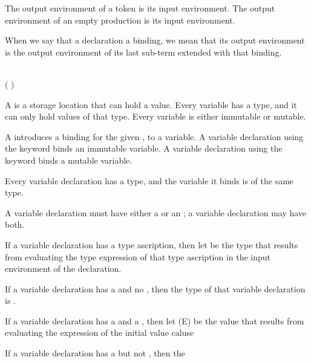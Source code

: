 The output environment of a token is its input environment.
The output environment of an empty production is its input environment.

When we say that a declaration  a binding, we mean that its output environment is the output environment of its last sub-term extended with that binding.


\begin{Syntax}
     \\
        ( \SynOr {}) 
            \SynOpt
            \SynOpt \code{;}
    
        \code{:} 
    
        \code{=} 
\end{Syntax}

A  is a storage location that can hold a value.
Every variable has a type, and it can only hold values of that type.
Every variable is either immutable or mutable.

A  introduces a binding for the given , to a variable.
A variable declaration using the  keyword binds an immutable variable.
A variable declaration using the  keyword binds a mutable variable.

Every variable declaration has a type, and the variable it binds is of the same type.

A variable declaration must have either a  or an ; a variable declaration may have both.

If a variable declaration has a type ascription, then let  be the type that results from evaluating the type expression of that type ascription in the input environment of the declaration.

If a variable declaration has a  and no , then the type of that variable declaration is .

If a variable declaration has a  and a , then let \MetaVar(E) be the value that results from evaluating the expression of the initial value caluse

If a variable declaration has a  but not , then the

